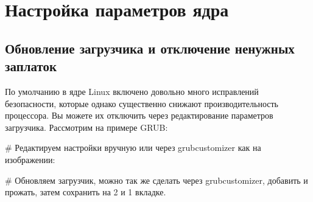 \documentclass[letterpaper,10pt,russian,openany]{sphinxmanual}
\begin{document}
\sphinxstepscope


\chapter{Настройка параметров ядра}
\label{\detokenize{source/kernel-parameters:kernel-parameters}}\label{\detokenize{source/kernel-parameters:id1}}\label{\detokenize{source/kernel-parameters::doc}}
\ignorespaces 

\section{Обновление загрузчика и отключение ненужных заплаток}
\label{\detokenize{source/kernel-parameters:update-bootloader-parameters}}\label{\detokenize{source/kernel-parameters:index-0}}\label{\detokenize{source/kernel-parameters:id2}}
\sphinxAtStartPar
По умолчанию в ядре Linux включено довольно много исправлений безопасности, которые однако существенно снижают производительность процессора.
Вы можете их отключить через редактирование параметров загрузчика. Рассмотрим на примере GRUB:

\sphinxAtStartPar
{} \# Редактируем настройки вручную или через grub\sphinxhyphen{}customizer как на изображении:

\noindent{}

\begin{sphinxVerbatim}[commandchars=\\\{\}]
\end{sphinxVerbatim}

\sphinxAtStartPar
{}
\# Обновляем загрузчик, можно так же сделать через grub\sphinxhyphen{}customizer, добавить и прожать, затем сохранить на 2 и 1 вкладке.

\ignorespaces 
\end{document}
